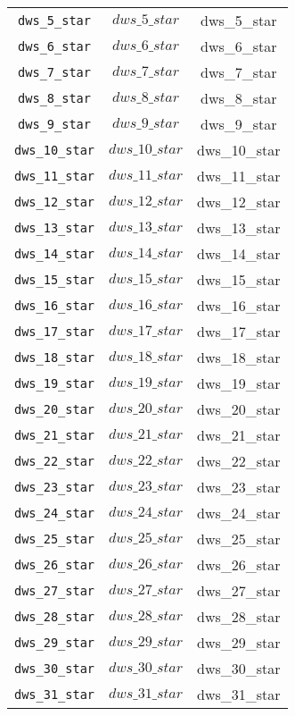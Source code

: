 \begin{center}
\begin{longtable}{ccc}
\texttt{dws\_5\_star} & $dws\_5\_star$ & dws\_5\_star\\
\texttt{dws\_6\_star} & $dws\_6\_star$ & dws\_6\_star\\
\texttt{dws\_7\_star} & $dws\_7\_star$ & dws\_7\_star\\
\texttt{dws\_8\_star} & $dws\_8\_star$ & dws\_8\_star\\
\texttt{dws\_9\_star} & $dws\_9\_star$ & dws\_9\_star\\
\texttt{dws\_10\_star} & $dws\_10\_star$ & dws\_10\_star\\
\texttt{dws\_11\_star} & $dws\_11\_star$ & dws\_11\_star\\
\texttt{dws\_12\_star} & $dws\_12\_star$ & dws\_12\_star\\
\texttt{dws\_13\_star} & $dws\_13\_star$ & dws\_13\_star\\
\texttt{dws\_14\_star} & $dws\_14\_star$ & dws\_14\_star\\
\texttt{dws\_15\_star} & $dws\_15\_star$ & dws\_15\_star\\
\texttt{dws\_16\_star} & $dws\_16\_star$ & dws\_16\_star\\
\texttt{dws\_17\_star} & $dws\_17\_star$ & dws\_17\_star\\
\texttt{dws\_18\_star} & $dws\_18\_star$ & dws\_18\_star\\
\texttt{dws\_19\_star} & $dws\_19\_star$ & dws\_19\_star\\
\texttt{dws\_20\_star} & $dws\_20\_star$ & dws\_20\_star\\
\texttt{dws\_21\_star} & $dws\_21\_star$ & dws\_21\_star\\
\texttt{dws\_22\_star} & $dws\_22\_star$ & dws\_22\_star\\
\texttt{dws\_23\_star} & $dws\_23\_star$ & dws\_23\_star\\
\texttt{dws\_24\_star} & $dws\_24\_star$ & dws\_24\_star\\
\texttt{dws\_25\_star} & $dws\_25\_star$ & dws\_25\_star\\
\texttt{dws\_26\_star} & $dws\_26\_star$ & dws\_26\_star\\
\texttt{dws\_27\_star} & $dws\_27\_star$ & dws\_27\_star\\
\texttt{dws\_28\_star} & $dws\_28\_star$ & dws\_28\_star\\
\texttt{dws\_29\_star} & $dws\_29\_star$ & dws\_29\_star\\
\texttt{dws\_30\_star} & $dws\_30\_star$ & dws\_30\_star\\
\texttt{dws\_31\_star} & $dws\_31\_star$ & dws\_31\_star\\

\end{longtable}
\end{center}
